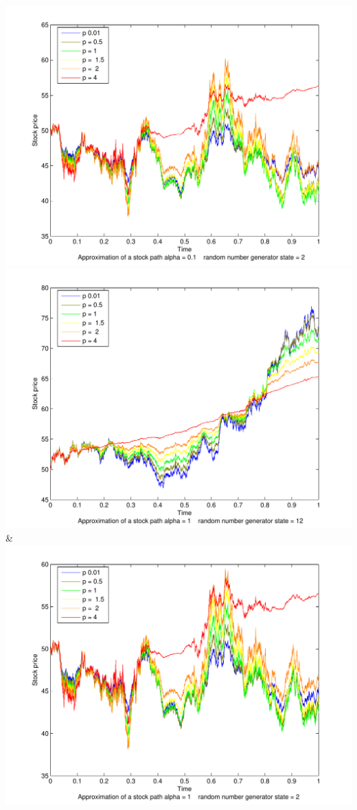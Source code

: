 \documentclass[a4paper,onecolumn]{IEEEtran}
\begin{document}
{			\includegraphics[width=\stockplotsize]{stock_s2_alpha0-1}\NN\cmidrule(lr){1-2}
		 \includegraphics[width=\stockplotsize]{stock_alpha1}&
			\includegraphics[width=\stockplotsize]{stock_s2_alpha1}\NN\cmidrule(lr){1-2}
}
\end{document}
